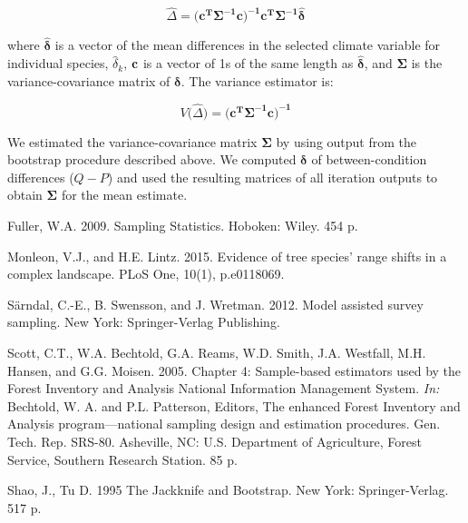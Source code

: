 \documentclass[12pt]{article}
\begin{document}
 \begin{equation} \label{eq:gls}
\hat{\Delta} = \big(\mathbf{c^T\Sigma^{-1}c\big)^{-1}c^T\Sigma^{-1}}\hat{\boldsymbol{\delta}}
\end{equation}

where $\hat{\boldsymbol{\delta}}$ is a vector of the mean differences in the selected climate variable for individual species, $\hat{\delta}_k$, $\bold{c}$ is a vector of 1s of the same length as $\hat{\boldsymbol{\delta}}$, and $\mathbf{\Sigma}$ is the variance-covariance matrix of $\boldsymbol{\delta}$.  The variance estimator is: 

 \begin{equation} \label{eq:glsV}
V\big(\hat{\Delta}\big) = \big(\mathbf{c^T\Sigma^{-1}c\big)^{-1}}
\end{equation}

We estimated the variance-covariance matrix $\mathbf{\Sigma}$ by using output from the bootstrap procedure described above.  We computed $\boldsymbol{\delta}$ of between-condition differences ($Q - P$) and used the resulting matrices of all iteration outputs to obtain $\mathbf{\Sigma}$ for the mean estimate. 

\begin{thebibliography}{2}



 Fuller, W.A.  2009.  Sampling Statistics. Hoboken: Wiley. 454 p.

 Monleon, V.J., and H.E. Lintz.  2015. Evidence of tree species’ range shifts in a complex landscape. PLoS One, 10(1), p.e0118069.

 S{\"a}rndal, C.-E., B. Swensson, and J. Wretman.  2012.  Model assisted survey sampling.  New York: Springer-Verlag Publishing.

 Scott, C.T., W.A. Bechtold, G.A. Reams, W.D. Smith, J.A. Westfall, M.H. Hansen, and G.G. Moisen.  2005.  Chapter 4: Sample-based estimators used by the Forest Inventory and Analysis National Information Management System.  \emph{In:} Bechtold, W. A. and P.L. Patterson, Editors, The enhanced Forest Inventory and Analysis program—national sampling design and estimation procedures. Gen. Tech. Rep. SRS-80. Asheville, NC: U.S. Department of Agriculture, Forest Service, Southern Research Station. 85 p.

 Shao, J., Tu D. 1995 The Jackknife and Bootstrap. New York: Springer-Verlag. 517 p.

\end{thebibliography}
\end{document}
